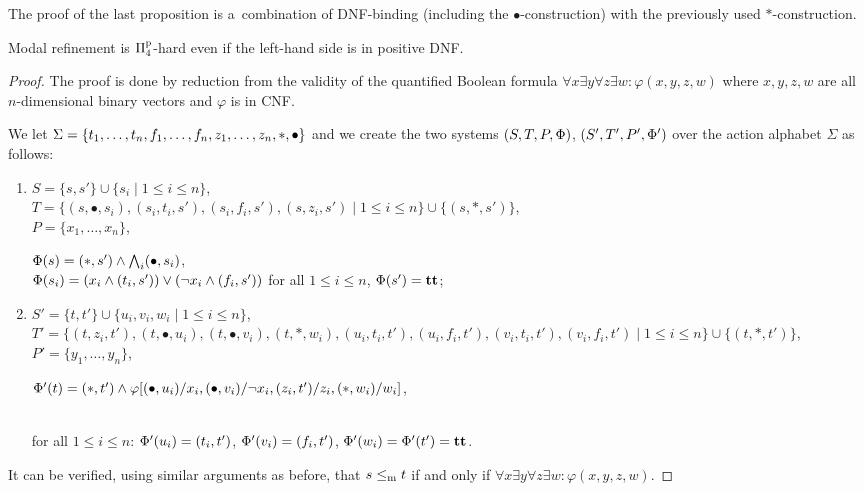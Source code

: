 The proof of the last proposition is a~combination of DNF-binding (including
the $\bullet$-construction) with the previously used $*$-construction.

\begin{proposition}\label{p:ld}
Modal refinement is $\mathrm\Pi^\mathrm p_4$-hard even if the left-hand side is in positive DNF.
\end{proposition}

\begin{proof}
The proof is done by reduction from the validity of the quantified
Boolean formula
 $\forall x \exists y \forall z \exists w : \varphi(x,y,z,w)$ where
 $x,y,z,w$ are all $n$-dimensional binary vectors and $\varphi$ is in CNF.

We let
$\mathrm{\Sigma} = \{t_1, \ldots, t_n, f_1, \ldots, f_n, 
        z_1, \ldots, z_n, *, \bullet \}$
and we create the two systems 
$(S,T,P,\mathrm{\Phi})$, $(S',T',P',\mathrm{\Phi}')$ over the
action alphabet $\Sigma$
as follows:
\begin{enumerate}
    \item $S = \{s,s'\} \cup \{s_i \mid 1 \le i \le n\}$,\\
$T = \{(s,\bullet,s_i), (s_i,t_i,s'), (s_i,f_i,s'),
(s,z_i,s') \mid 1 \le i \le n\} \cup \{(s,*,s')\}$,\\
$P = \{ x_1, \ldots, x_n \}$, 

$\mathrm{\Phi}(s) = (*,s') \wedge \bigwedge_i (\bullet,s_i)$,\\
$\mathrm{\Phi}(s_i) = (x_i \wedge (t_i,s')) \vee (\neg x_i \wedge (f_i,s'))$
for all $1 \le i \le n$,
$\mathrm{\Phi}(s') = \mathbf{tt}$;
\item 
$S' = \{t, t'\} \cup \{u_i, v_i, w_i \mid 1 \le i \le n\}$,\\
$T' = \{(t,z_i,t'), (t,\bullet,u_i), (t,\bullet,v_i),\allowbreak
(t,*,w_i), \allowbreak(u_i,t_i,t'), (u_i,f_i,t'), (v_i,t_i,t'),
\allowbreak
(v_i,f_i,t') \mid 1 \le i \le n\} \cup \{(t,*,t')\}$,\\

$P' = \{ y_1, \ldots, y_n \}$,

$\mathrm{\Phi}'(t) = (*,t') \wedge \allowbreak \varphi[(\bullet,u_i)/x_i,
        (\bullet,v_i)/\neg x_i,
        (z_i,t')/z_i,
        (*,w_i)/w_i]$,

\\for all $1 \le i \le n$: $\mathrm{\Phi}'(u_i) = (t_i,t')$,
$\mathrm{\Phi}'(v_i) = (f_i,t')$,
$\mathrm{\Phi}'(w_i) = \mathrm{\Phi}'(t') = \mathbf{tt}$.


\end{enumerate}

 It can be verified, using similar arguments as before, that 
$s \le_\mathrm m t$ if and only if \linebreak
$\forall x \exists y \forall z \exists w : \varphi(x,y,z,w)$.
\end{proof}


